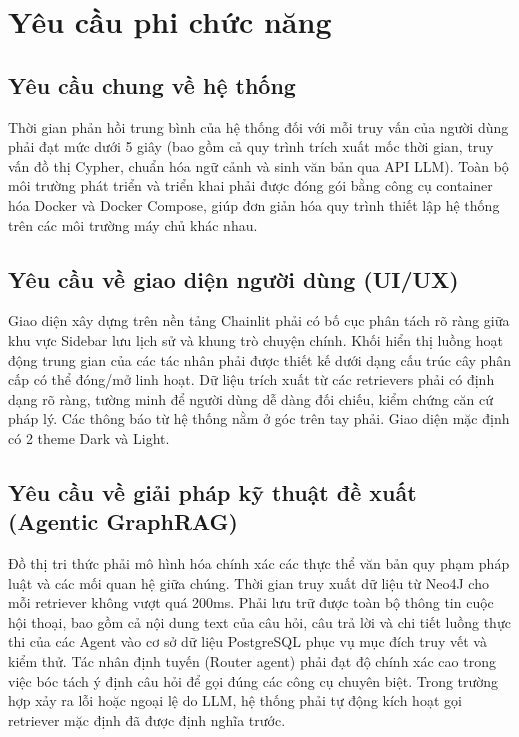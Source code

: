 \documentclass[../DoAn.tex]{subfiles}
\begin{document}
\section{Yêu cầu phi chức năng}
\label{section:2.4}
\subsection{Yêu cầu chung về hệ thống}
Thời gian phản hồi trung bình của hệ thống đối với mỗi truy vấn của người dùng phải đạt mức dưới 5 giây (bao gồm cả quy trình trích xuất mốc thời gian, truy vấn đồ thị Cypher, chuẩn hóa ngữ cảnh và sinh văn bản qua API LLM). Toàn bộ môi trường phát triển và triển khai phải được đóng gói bằng công cụ container hóa Docker và Docker Compose, giúp đơn giản hóa quy trình thiết lập hệ thống trên các môi trường máy chủ khác nhau.
\subsection{Yêu cầu về giao diện người dùng (UI/UX)}
\label{subsection:2.4.2}
Giao diện xây dựng trên nền tảng Chainlit phải có bố cục phân tách rõ ràng giữa khu vực Sidebar lưu lịch sử và khung trò chuyện chính. Khối hiển thị luồng hoạt động trung gian của các tác nhân phải được thiết kế dưới dạng cấu trúc cây phân cấp có thể đóng/mở linh hoạt. Dữ liệu trích xuất từ các retrievers  phải có định dạng rõ ràng, tường minh để người dùng dễ dàng đối chiếu, kiểm chứng căn cứ pháp lý. Các thông báo từ hệ thống nằm ở góc trên tay phải. Giao diện mặc định có 2 theme Dark và Light. 
\subsection{Yêu cầu về giải pháp kỹ thuật đề xuất (Agentic GraphRAG)}
\label{subsection:2.4.3}
 Đồ thị tri thức phải mô hình hóa chính xác các thực thể văn bản quy phạm pháp luật và các mối quan hệ giữa chúng. Thời gian truy xuất dữ liệu từ Neo4J cho mỗi retriever không vượt quá 200ms. Phải lưu trữ được toàn bộ thông tin cuộc hội thoại, bao gồm cả nội dung text của câu hỏi, câu trả lời và chi tiết luồng thực thi của các Agent vào cơ sở dữ liệu PostgreSQL phục vụ mục đích truy vết và kiểm thử. Tác nhân định tuyến (Router agent) phải đạt độ chính xác cao trong việc bóc tách ý định câu hỏi để gọi đúng các công cụ chuyên biệt. Trong trường hợp xảy ra lỗi hoặc ngoại lệ do LLM, hệ thống phải tự động kích hoạt gọi retriever mặc định đã được định nghĩa trước.
\end{document}
